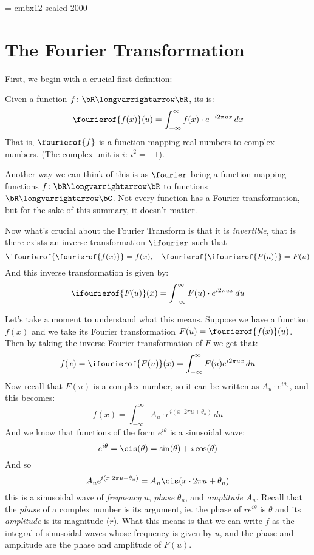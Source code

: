 \documentclass[10pt]{article}
\begin{document}
\font\bigbf = cmbx12 scaled 2000

\section{The Fourier Transformation}

First, we begin with a crucial first definition:

\begin{defn*}

    Given a function $f\colon\bR\longvarrightarrow\bR$, its  is:
    \[ \fourierof{f(x)}(u) = \int_{-\infty}^\infty f(x)\cdot e^{-i2\pi ux}\,dx \]
    That is, $\fourierof{f}$ is a function mapping real numbers to complex numbers.
    (The complex unit is $i$: $i^2=-1$).

\end{defn*}

Another way we can think of this is as $\fourier$ being a function mapping functions $f\colon\bR\longvarrightarrow\bR$ to functions $\bR\longvarrightarrow\bC$.
Not every function has a Fourier transformation, but for the sake of this summary, it doesn't matter.

Now what's crucial about the Fourier Transform is that it is \emph{invertible}, that is there exists an inverse transformation $\ifourier$ such that
\[ \ifourierof{\fourierof{f(x)}}=f(x),\quad \fourierof{\ifourierof{F(u)}} = F(u) \]
And this inverse transformation is given by:
\[ \ifourierof{F(u)}(x) = \int_{-\infty}^\infty F(u)\cdot e^{i2\pi ux}\,du \]

Let's take a moment to understand what this means.
Suppose we have a function $f(x)$ and we take its Fourier transformation $F(u)=\fourierof{f(x)}(u)$.
Then by taking the inverse Fourier transformation of $F$ we get that:
\[ f(x) = \ifourierof{F(u)}(x) = \int_{-\infty}^\infty F(u) e^{i2\pi ux}\,du \]
Now recall that $F(u)$ is a complex number, so it can be written as $A_u\cdot e^{i\theta_u}$, and this becomes:
\[ f(x) = \int_{-\infty}^\infty A_u\cdot e^{i(x\cdot 2\pi u + \theta_u)}\,du \]
And we know that functions of the form $e^{i\theta}$ is a sinusoidal wave:
\[ e^{i\theta} = \cis(\theta) = \sin(\theta) + i\cos(\theta) \]
And so
\[ A_ue^{i(x\cdot 2\pi u + \theta_u)} = A_u\cis(x\cdot 2\pi u + \theta_u) \]
this is a sinusoidal wave of \emph{frequency} $u$, \emph{phase} $\theta_u$, and \emph{amplitude} $A_u$.
Recall that the \emph{phase} of a complex number is its argument, ie. the phase of $re^{i\theta}$ is $\theta$ and its \emph{amplitude} is its magnitude ($r$).
What this means is that we can write $f$ as the integral of sinusoidal waves whose frequency is given by $u$, and the phase and amplitude are the phase and amplitude of $F(u)$.
\end{document}
